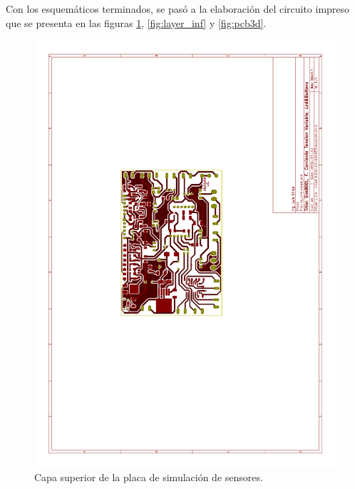 Con los esquemáticos terminados, se pasó a la elaboración del circuito impreso que se presenta en las figuras \ref{fig:layer_sup}, \ref{fig:layer_inf} y \ref{fig:pcb3d}.
\begin{figure}[!hp]
  \centering
  \includegraphics[page=1,angle=270,clip,trim=5.5cm 10cm 7.7cm 8.5cm]{./Figures/pcb_layer.pdf}
  \caption{Capa superior de la placa de simulación de sensores.}
  \label{fig:layer_sup}
\end{figure}
